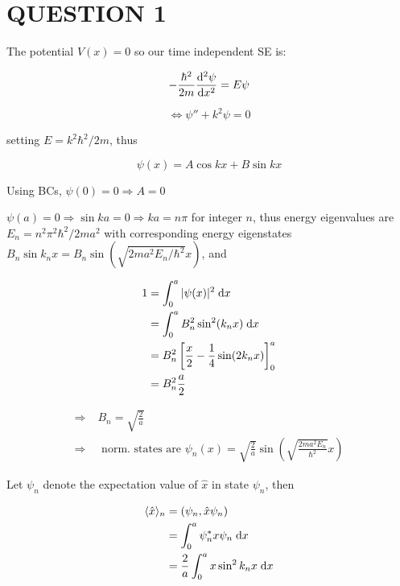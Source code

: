 \documentclass[a4paper]{article}
\begin{document}
	
\maketitle

\section{QUESTION 1}


The potential $ V(x) = 0 $ so our time independent SE is:

\[ -\frac{\hbar^{2}}{2m} \frac{\mathrm{d}^{2} \psi}{\mathrm{d} x^{2}} = E \psi  \]

\[ \iff \psi'' + k^{2} \psi = 0 \]

setting $ E = k^{2} \hbar^{2} / 2m $, thus 

\[ \psi(x) = A \cos k x + B \sin k x \]

Using BCs, $ \psi(0) = 0 \Rightarrow A = 0 $

$ \psi(a) = 0 \Rightarrow \sin k a = 0 \Rightarrow k a =  n \pi  $ for integer $ n $, thus energy eigenvalues are $ E_{n} = n^{2} \pi^{2} \hbar^{2} / 2m a^{2} $ with corresponding energy eigenstates $ B_{n} \sin k_{n} x = B_{n} \sin ( \sqrt{2 m a^{2 }E_{n} / \hbar^{2} } x ) $, and 

\begin{align*}
1 & = \int_{0}^{a} |  \psi(x) |^{2} \; \mathrm{d} x \\
& = \int_{0}^{a} B_{n}^{2} \sin^{2} ( k_{n} x ) \; \mathrm{d} x  \\
& = B_{n}^{2} \left[  \frac{x}{2}  - \frac{1}{4} \sin ( 2 k_{n} x ) \right]_{0}^{a} \\
& = B_{n}^{2} \frac{a}{2}
\end{align*}

\begin{align*}
\Rightarrow \; & B_{n}  = \sqrt{\frac{2}{a}} \\
\Rightarrow & \text{ norm. states are } \psi_{n}(x) = \sqrt{\frac{2}{a}} \sin \left(    \sqrt{\frac{2m a^{2} E_{n}}{\hbar^{2}} } x \right)
\end{align*} 

Let $ \psi_{n} $ denote the expectation value of $ \hat{x} $ in state $ \psi_{n} $, then

\begin{align*}
\langle \hat{x} \rangle_{n} & = (\psi_{n},\hat{x} \psi_{n} )  \\
& = \int_{0}^{a} \psi_{n}^{*} x \psi_{n} \; \mathrm{d} x \\
& = \frac{2}{a} \int_{0}^{a}  x \sin^{2} k_{n} x \; \mathrm{d} x \\
\end{align*}
\end{document}
